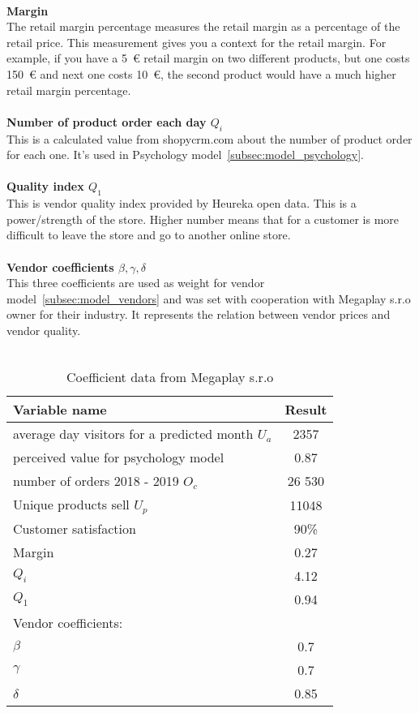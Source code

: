 \\
\textbf{Margin}\\
The retail margin percentage measures the retail margin as a percentage of the retail price.
This measurement gives you a context for the retail margin.
For example, if you have a 5~€ retail margin on two different products, but one costs 150~€ and next one costs 10~€, the second product would have a much higher retail margin percentage.\\
\\
\textbf{Number of product order each day $Q_i$}\\
This is a calculated value from shopycrm.com about the number of product order for each one.
It's used in Psychology model~\ref{subsec:model_psychology}. \\
\\
\textbf{Quality index $Q_1$}\\
This is vendor quality index provided by Heureka open data.
This is a power/strength of the store.
Higher number means that for a customer is more difficult to leave the store and go to another online store.\\
\\
\textbf{Vendor coefficients $\beta, \gamma, \delta$} \label{vendorCoeff}\\
This three coefficients are used as weight for vendor model~\ref{subsec:model_vendors} and was set with cooperation with Megaplay s.r.o owner for their industry.
It represents the relation between vendor prices and vendor quality.\\
\\
\begin{table}[h!]
    \begin{center}
        \begin{tabular}{ | l | c |}
            \hline
            {\textbf{Variable name}} & \textbf{Result}\\
            \hline
            average day visitors for a predicted month $U_a$& 2357 \\
            perceived value for psychology model & 0.87 \\
            number of orders 2018 - 2019 $O_c$ & 26 530 \\
            Unique products sell $U_p$ & 11048\\
            Customer satisfaction & 90\%\\
            Margin & 0.27\\
            $Q_i$ & 4.12\\
            $Q_1$ & 0.94\\
            Vendor coefficients: & \\
            $\beta$ & 0.7\\
            $\gamma$ & 0.7\\
            $\delta$ & 0.85\\
            \hline
        \end{tabular}
    \end{center}
    \caption{Coefficient data from Megaplay s.r.o}
    \label{megaplay_data}
\end{table}
